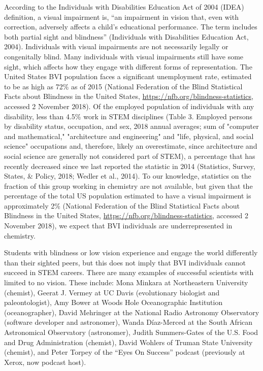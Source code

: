 \documentclass[11.5pt]{sig-alternate} %
\begin{document}
\begin{large}
According to the Individuals with Disabilities Education Act of 2004 (IDEA) definition, a visual impairment is, “an impairment in vision that, even with correction, adversely affects a child’s educational performance. The term includes both partial sight and blindness” (Individuals with Disabilities Education Act, 2004). Individuals with visual impairments are not necessarily legally or congenitally blind. Many individuals with visual impairments still have some sight, which affects how they engage with different forms of representation. The United States BVI population faces a significant unemployment rate, estimated to be as high as 72\% as of 2015 (National Federation of the Blind Statistical Facts about Blindness in the United States, \url{https://nfb.org/blindness-statistics}, accessed 2 November 2018). Of the employed population of individuals with any disability, less than 4.5\% work in STEM disciplines (Table 3. Employed persons by disability status, occupation, and sex, 2018 annual averages; sum of "computer and mathematical," "architecture and engineering" and "life, physical, and social science" occupations and, therefore, likely an overestimate, since architecture and social science are generally not considered part of STEM), a percentage that has recently decreased since we last reported the statistic in 2014 (Statistics, Survey, States, \& Policy, 2018; Wedler et al., 2014). To our knowledge, statistics on the fraction of this group working in chemistry are not available, but given that the percentage of the total US population estimated to have a visual impairment is approximately 2\% (National Federation of the Blind Statistical Facts about Blindness in the United States, \url{https://nfb.org/blindness-statistics}, accessed 2 November 2018), we expect that BVI individuals are underrepresented in chemistry. 

Students with blindness or low vision experience and engage the world differently than their sighted peers, but this does not imply that BVI individuals cannot succeed in STEM careers. There are many examples of successful scientists with limited to no vision. These include: Mona Minkara at Northeastern University (chemist), Geerat J. Vermey at UC Davis (evolutionary biologist and paleontologist), Amy Bower at Woods Hole Oceanographic Institution (oceanographer), David Mehringer at the National Radio Astronomy Observatory (software developer and astronomer), Wanda Díaz-Merced at the South African Astronomical Observatory (astronomer), Judith Summers-Gates of the U.S. Food and Drug Administration (chemist), David Wohlers of Truman State University (chemist), and Peter Torpey of the “Eyes On Success” podcast (previously at Xerox, now podcast host).


\end{large}
\end{document}
